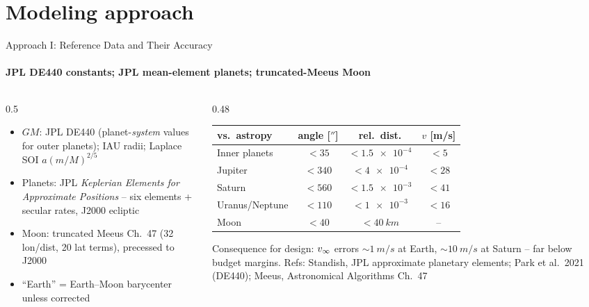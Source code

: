 \documentclass[aspectratio=169,10pt]{beamer}
\newcommand{\src}[1]{\vfill\hfill{\tiny\color{gray}#1}}
\begin{document}
\section{Modeling approach}
\begin{frame}{Approach I: Reference Data and Their Accuracy}
  \framesubtitle{JPL DE440 constants; JPL mean-element planets; truncated-Meeus Moon}
\small
\begin{columns}[T]
\begin{column}{0.5\textwidth}
\begin{itemize}
\item $GM$: JPL DE440 (planet-\emph{system} values for outer planets); IAU radii; Laplace SOI $a(m/M)^{2/5}$
\item Planets: JPL \emph{Keplerian Elements for Approximate Positions} -- six elements + secular rates, J2000 ecliptic
\item Moon: truncated Meeus Ch.~47 (32 lon/dist, 20 lat terms), precessed to J2000
\item ``Earth'' = Earth--Moon barycenter unless corrected
\end{itemize}
\end{column}
\begin{column}{0.48\textwidth}
\footnotesize
\begin{tabular}{@{}lccc@{}}\toprule
vs.\ astropy & angle [$''$] & rel.\ dist. & $v$ [m/s] \\\midrule
Inner planets & $<35$ & $<\num{1.5e-4}$ & $<5$ \\
Jupiter & $<340$ & $<\num{4e-4}$ & $<28$ \\
Saturn & $<560$ & $<\num{1.5e-3}$ & $<41$ \\
Uranus/Neptune & $<110$ & $<\num{1e-3}$ & $<16$ \\
Moon & $<40$ & $<\SI{40}{km}$ & -- \\\bottomrule
\end{tabular}
\medskip

Consequence for design: $v_\infty$ errors $\sim\SI{1}{m/s}$ at Earth, $\sim\SI{10}{m/s}$ at Saturn -- far below budget margins.
\src{Refs: Standish, JPL approximate planetary elements; Park et al.\ 2021 (DE440); Meeus, Astronomical Algorithms Ch.~47}
\end{column}
\end{columns}
\end{frame}
\end{document}
